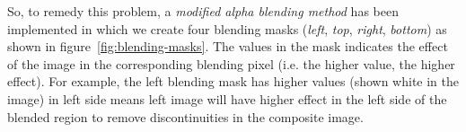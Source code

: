 \noindent So, to remedy this problem, a \emph{modified alpha blending method} has been implemented in which we create four blending masks (\emph{left}, \emph{top}, \emph{right}, \emph{bottom}) as shown in figure~\ref{fig:blending-masks}. The values in the mask indicates the effect of the image in the corresponding blending pixel (i.e. the higher value, the higher effect). For example, the left blending mask has higher values (shown white in the image) in left side means left image will have higher effect in the left side of the blended region to remove discontinuities in the composite image.\\


\begin{figure}[H]%
\centering
{}

\end{figure}
